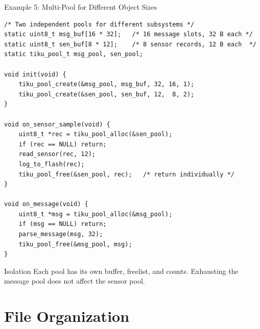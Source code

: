 \documentclass[aspectratio=169, 10pt]{beamer}
\begin{document}
\begin{frame}[fragile]{Example 5: Multi-Pool for Different Object Sizes}
\begin{lstlisting}[style=cstyle]
/* Two independent pools for different subsystems */
static uint8_t msg_buf[16 * 32];   /* 16 message slots, 32 B each */
static uint8_t sen_buf[8 * 12];    /* 8 sensor records, 12 B each  */
static tiku_pool_t msg_pool, sen_pool;

void init(void) {
    tiku_pool_create(&msg_pool, msg_buf, 32, 16, 1);
    tiku_pool_create(&sen_pool, sen_buf, 12,  8, 2);
}

void on_sensor_sample(void) {
    uint8_t *rec = tiku_pool_alloc(&sen_pool);
    if (rec == NULL) return;
    read_sensor(rec, 12);
    log_to_flash(rec);
    tiku_pool_free(&sen_pool, rec);   /* return individually */
}

void on_message(void) {
    uint8_t *msg = tiku_pool_alloc(&msg_pool);
    if (msg == NULL) return;
    parse_message(msg, 32);
    tiku_pool_free(&msg_pool, msg);
}
\end{lstlisting}

\begin{block}{Isolation}
Each pool has its own buffer, freelist, and counts.
Exhausting the message pool does not affect the sensor pool.
\end{block}
\end{frame}

\section{File Organization}
\end{document}
